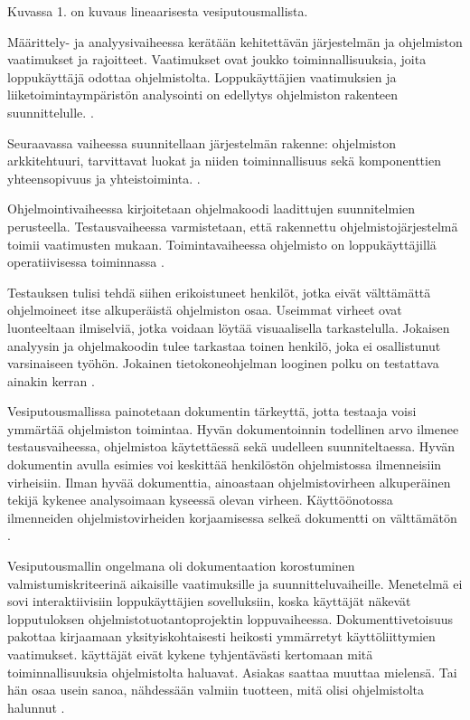 \documentclass[finnish]{tktltiki2}
\theoremstyle{definition}
\theoremstyle{remark}
\begin{document}
Kuvassa 1. on kuvaus lineaarisesta vesiputousmallista.

Määrittely- ja analyysivaiheessa kerätään kehitettävän järjestelmän ja ohjelmiston vaatimukset ja rajoitteet. Vaatimukset ovat joukko toiminnallisuuksia, joita loppukäyttäjä odottaa ohjelmistolta. Loppukäyttäjien vaatimuksien ja liiketoimintaympäristön analysointi on edellytys ohjelmiston rakenteen suunnittelulle. \cite{ROY70}.

Seuraavassa vaiheessa suunnitellaan järjestelmän rakenne: ohjelmiston arkkitehtuuri, tarvittavat luokat ja niiden toiminnallisuus sekä komponenttien yhteensopivuus ja yhteistoiminta. \cite{ROY70}.

Ohjelmointivaiheessa kirjoitetaan ohjelmakoodi laadittujen suunnitelmien perusteella. Testausvaiheessa varmistetaan, että rakennettu ohjelmistojärjestelmä toimii vaatimusten mukaan. Toimintavaiheessa ohjelmisto on loppukäyttäjillä operatiivisessa toiminnassa \cite{ROY70}. 

Testauksen tulisi tehdä siihen erikoistuneet henkilöt, jotka eivät välttämättä ohjelmoineet itse alkuperäistä ohjelmiston osaa. Useimmat virheet ovat luonteeltaan ilmiselviä, jotka voidaan löytää visuaalisella tarkastelulla. Jokaisen analyysin ja ohjelmakoodin tulee tarkastaa toinen henkilö, joka ei osallistunut varsinaiseen työhön. Jokainen tietokoneohjelman looginen polku on testattava ainakin kerran \cite{ROY70}.

Vesiputousmallissa painotetaan dokumentin tärkeyttä, jotta testaaja voisi ymmärtää ohjelmiston toimintaa. Hyvän dokumentoinnin todellinen arvo ilmenee testausvaiheessa, ohjelmistoa käytettäessä sekä uudelleen suunniteltaessa. Hyvän dokumentin avulla esimies voi keskittää henkilöstön ohjelmistossa ilmenneisiin virheisiin. Ilman hyvää dokumenttia, ainoastaan ohjelmistovirheen alkuperäinen tekijä kykenee analysoimaan kyseessä olevan virheen. Käyttöönotossa ilmenneiden ohjelmistovirheiden korjaamisessa selkeä dokumentti on välttämätön \cite{ROY70}.

Vesiputousmallin ongelmana oli dokumentaation korostuminen valmistumiskriteerinä aikaisille vaatimuksille ja suunnitteluvaiheille. Menetelmä ei sovi interaktiivisiin loppukäyttäjien sovelluksiin, koska käyttäjät näkevät lopputuloksen ohjelmistotuotantoprojektin loppuvaiheessa. Dokumenttivetoisuus pakottaa kirjaamaan yksityiskohtaisesti heikosti ymmärretyt käyttöliittymien vaatimukset. käyttäjät eivät kykene tyhjentävästi kertomaan mitä toiminnallisuuksia ohjelmistolta haluavat. Asiakas saattaa muuttaa mielensä. Tai hän osaa usein sanoa, nähdessään valmiin tuotteen, mitä olisi ohjelmistolta halunnut \cite{BEC99}.
\end{document}
